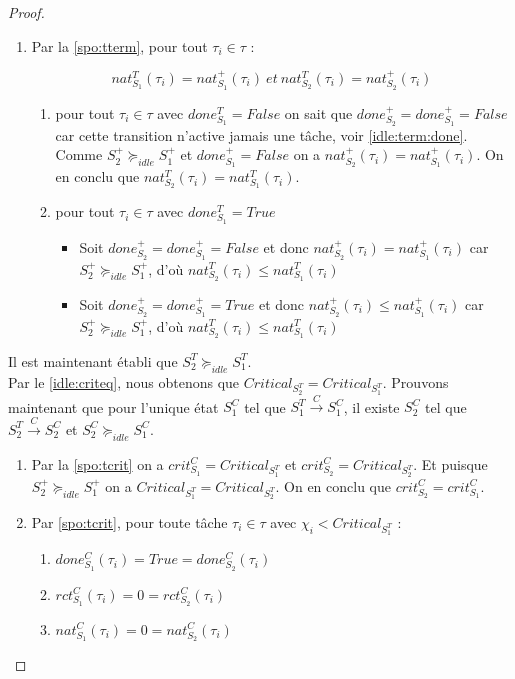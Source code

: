 \documentclass[12pt,a4paper,oneside]{book}
\theoremstyle{break}
\theoremstyle{breakplain}
\begin{document}
\begin{proof}
\begin{enumerate}
\item Par la \autoref{spo:tterm}, pour tout $\tau_i \in \tau$ :

\begin{equation}
nat_{S_1}^T(\tau_i) = nat_{S_1}^+(\tau_i)\ et\ nat_{S_2}^T(\tau_i) = nat_{S_2}^+(\tau_i)
\end{equation}

\begin{enumerate}
\item pour tout $\tau_i \in \tau$ avec $done_{S_1}^T = False$ on sait que $done_{S_2}^+ = done_{S_1}^+ = False$ car cette transition n'active jamais une tâche, voir \autoref{idle:term:done}. Comme $S^+_2 \succeq_{idle} S^+_1$ et $done_{S_1}^+ = False$ on a $nat_{S_2}^+(\tau_i)= nat_{S_1}^+(\tau_i)$. On en conclu que $nat_{S_2}^T(\tau_i) = nat_{S_1}^T(\tau_i)$.

\item pour tout $\tau_i \in \tau$ avec $done_{S_1}^T = True$
\begin{itemize}
\item Soit $done_{S_2}^+ = done_{S_1}^+ = False$ et donc $nat_{S_2}^+(\tau_i)= nat_{S_1}^+(\tau_i)$ car $S^+_2 \succeq_{idle} S^+_1$, d'où $nat_{S_2}^T(\tau_i) \le nat_{S_1}^T(\tau_i)$
\item Soit $done_{S_2}^+ = done_{S_1}^+ = True$ et donc $nat_{S_2}^+(\tau_i)\le nat_{S_1}^+(\tau_i)$ car $S^+_2 \succeq_{idle} S^+_1$, d'où $nat_{S_2}^T(\tau_i) \le nat_{S_1}^T(\tau_i)$
\end{itemize}
\end{enumerate}


\end{enumerate}
Il est maintenant établi que $S^T_2 \succeq_{idle} S^T_1$.\\

Par le \autoref{idle:criteq}, nous obtenons que $Critical_{S_2^T} = Critical_{S_1^T}$. Prouvons maintenant que pour l'unique état $S_1^C$ tel que $S^{T}_1\xrightarrow{C}S^{C}_1$, il existe $S_2^C$ tel que $S^{T}_2\xrightarrow{C}S^{C}_2$ et $S^C_2 \succeq_{idle} S^C_1$.

\begin{enumerate}

\item Par la \autoref{spo:tcrit} on a $crit_{S_1}^C = Critical_{S_1^T}$ et $crit_{S_2}^C = Critical_{S_2^T}$. Et puisque $S^+_2 \succeq_{idle} S^+_1$ on a $Critical_{S_1^T} = Critical_{S_2^T}$. On en conclu que $crit_{S_2}^C= crit_{S_1}^C$.


\item Par \autoref{spo:tcrit}, pour toute tâche $\tau_i \in \tau$ avec $\chi_i < Critical_{S_1^T}$ :
\begin{enumerate}[label=(\alph*)]
\item $done_{S_1}^C(\tau_i) = True = done_{S_2}^C(\tau_i)$
\item $rct_{S_1}^C(\tau_i) = 0 = rct_{S_2}^C(\tau_i)$
\item $nat_{S_1}^C(\tau_i) = 0 = nat_{S_2}^C(\tau_i)$
\end{enumerate}


\end{enumerate}
\end{proof}
\end{document}
